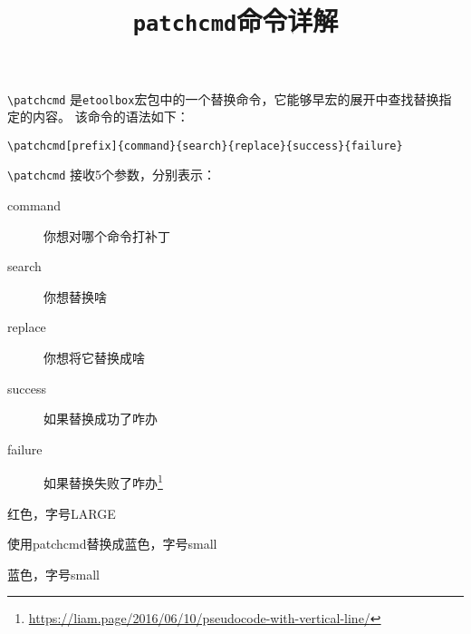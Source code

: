 \documentclass{ctexart}
\title{\texttt{patchcmd}命令详解}
\begin{document}
	
	\maketitle
	
	\verb|\patchcmd| 是\texttt{etoolbox}宏包中的一个替换命令，它能够早宏的展开中查找替换指定的内容。
	该命令的语法如下：
	\medskip
	
	\verb|\patchcmd[prefix]{command}{search}{replace}{success}{failure}|
	\medskip
	
	\verb|\patchcmd|  接收5个参数，分别表示：
	\begin{description}
		\item[command] 你想对哪个命令打补丁
		\item[search] 你想替换啥
		\item[replace] 你想将它替换成啥
		\item[success] 如果替换成功了咋办
		\item[failure] 如果替换失败了咋办\footnote{\url{https://liam.page/2016/06/10/pseudocode-with-vertical-line/}}
	\end{description}
	
	\begin{tcblisting}{}
\newcommand{\mystr}[1]{{\color{red}\LARGE #1}}

\mystr{红色，字号LARGE}

使用patchcmd替换成蓝色，字号small


\mystr{蓝色，字号small}
\end{tcblisting}
\end{document}
